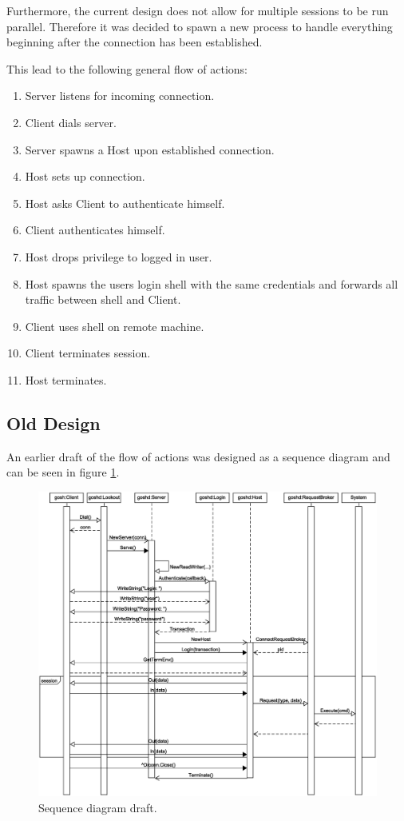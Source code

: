 \documentclass[10pt,a4paper,titlepage,twoside,english,final]{zhawreprt}
\begin{document}
Furthermore, the current design does not allow for multiple sessions to be run parallel.
Therefore it was decided to spawn a new process to handle everything beginning after the connection has been established.

This lead to  the following general flow of actions:

\begin{enumerate}
\item Server listens for incoming connection.
\item Client dials server.
\item Server spawns a Host upon established connection.
\item Host sets up connection.
\item Host asks Client to authenticate himself.
\item Client authenticates himself.
\item Host drops privilege to logged in user.
\item Host spawns the users \gls{login} \gls{shell} with the same credentials and forwards all traffic between \gls{shell} and Client.
\item Client uses \gls{shell} on remote machine.
\item Client terminates session.
\item Host terminates.
\end{enumerate}

\newpage
\subsection{Old Design}\label{ssec:OldDesign}
An earlier draft of the flow of actions was designed as a sequence diagram and can be seen in figure \ref{fig:SeqDiaOriginal}.
\begin{figure}[ht]
\includegraphics[width=\textwidth]{SequenceDiagram}
\caption{Sequence diagram draft.}
\label{fig:SeqDiaOriginal}
\end{figure}
\end{document}

